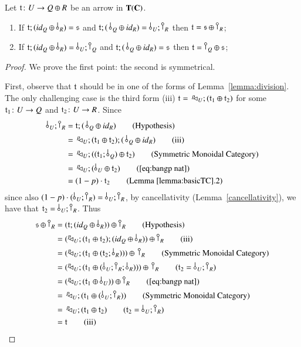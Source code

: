 \begin{lemma}\label{keyLemma001}
Let $\mathfrak{t}\colon U \to Q \oplus R$ be an arrow in $\mathbf{T}(\mathbf{C})$. 
\begin{enumerate} 
\item If $\t; (\id{Q} \oplus\, \bangp{R}) =\s$
and $\t; (\,\bang{Q} \oplus \id{R}) = \bang{U}; \cobang{R}$ then $\t =\s \oplus \cobang{R}$;
\item If $\t; (\id{Q} \oplus\, \bangp{R}) =\bang{U}; \cobang{Q}$  
and $\t; (\,\bang{Q} \oplus \id{R}) = \s$ then $\t = \cobang{Q} \oplus \s$;
\end{enumerate}
\end{lemma}
\begin{proof}
We prove the first point: the second is symmetrical.

First, observe that $\mathfrak{t}$ should be in one of the forms of Lemma~\ref{lemma:division}. The only challenging case is the third form (iii) $\mathfrak{t}=\,^p\!\! \lhd_{U}; (\mathfrak{t}_1 \oplus \mathfrak{t}_2)$ for some $\mathfrak{t}_1\colon U \to Q$ and $\mathfrak{t}_2\colon U \to R$. Since
\begin{align*}
\bang{U}; \cobang{R} &= \t; (\,\bang{Q} \oplus \id{R}) \tag{Hypothesis}\\
&=\, \diagp{U}; (\t_1 \oplus \t_2) ; (\,\bang{Q} \oplus \id{R}) \tag{iii}\\
&=\, \diagp{U}; ((\t_1 ; \bang{Q}) \oplus \t_2) \tag{Symmetric Monoidal Category}\\
&=\, \diagp{U} ; (\bang{U} \oplus \t_2) \tag{\ref{eq:bangp nat}}\\
&= (1-p)\cdot \t_2 \tag{Lemma \ref{lemma:basicTC}.2}
\end{align*}
since also $(1-p)\cdot (\bang{U}; \cobang{R})=\bang{U}; \cobang{R}$, by cancellativity (Lemma~\ref{cancellativity}), we have that $\t_2 = \bang{U}; \cobang{R}$.
Thus
\begin{align*}
\s \oplus \cobang{R} & = (\t; (\id{Q} \oplus\, \bangp{R})) \oplus \cobang{R} \tag{Hypothesis}\\
&= (\diagp{U}; (\t_1 \oplus \t_2) ; (\id{Q} \oplus\, \bangp{R})) \oplus \cobang{R} \tag{iii}\\
&= (\diagp{U}; (\t_1 \oplus (\t_2 ; \bang{R})))  \oplus\, \cobang{R} \tag{Symmetric Monoidal Category}\\
&= (\diagp{U}; (\t_1 \oplus ( \bang{U}; \cobang{R} ; \bang{R})))  \oplus\, \cobang{R} \tag{$\t_2 = \bang{U}; \cobang{R}$}\\
&= (\diagp{U}; (\t_1 \oplus  \bang{U}) ) \oplus \cobang{R} \tag{\ref{eq:bangp nat}}\\
&=\, \diagp{U}; (\t_1 \oplus  (\bang{U} ; \cobang{R}))\tag{Symmetric Monoidal Category}\\
&=\, \diagp{U}; (\t_1 \oplus  \t_2)\tag{$\t_2 = \bang{U}; \cobang{R}$}\\
&= \t \tag{iii}\\
\end{align*}
\end{proof}


